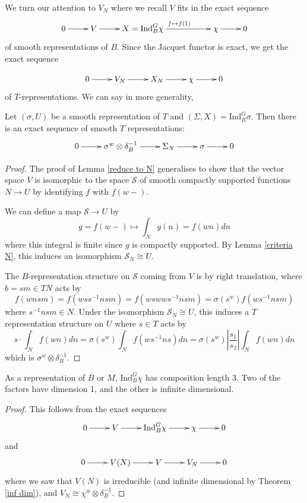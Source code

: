 We turn our attention to $V_N$ where we recall $V$ fits in the exact sequence
$$\xymatrix{0 \ar[r] & V \ar[r] & X = \mathrm{Ind}_B^G \chi \ar[rr]^{f \mapsto f(1)} && \chi \ar[r] & 0}$$ of smooth representations of $B$. Since the Jacquet functor is exact, we get the exact sequence

$$\xymatrix{0 \ar[r] & V_N \ar[r] & X_N \ar[r] & \chi \ar[r] & 0}$$ of $T$-representations. We can say in more generality,

\begin{lemma}
    Let $(\sigma, U)$ be a smooth representation of $T$ and $(\Sigma, X) = \mathrm{Ind}_B^G \sigma$. Then there is an exact sequence of smooth $T$ representations:
    $$\xymatrix{0 \ar[r] & \sigma^w \otimes \delta_B^{-1} \ar[r] & \Sigma_N \ar[r] & \sigma \ar[r] & 0}$$
\end{lemma}
\begin{proof}
    The proof of Lemma \ref{reduce to N} generalises to show that the vector space $V$ is isomorphic to the space $\mathcal S$ of smooth compactly supported functions $N \to U$ by identifying $f$ with $f(w-)$.

    We can define a map $\mathcal S \to U$ by 
    $$g=f(w-) \mapsto \int_N g(n)=f(wn) dn$$ where this integral is finite since $g$ is compactly supported. By Lemma \ref{criteria N}, this induces an isomorphism $\mathcal S_N \cong U$.

    The $B$-representation structure on $\mathcal S$ coming from $V$ is by right translation, where $b=sm \in TN$ acts by
    $$f(wnsm) = f(wss^{-1}nsm) = f(wswws^{-1}nsm) = \sigma(s^w) f(ws^{-1}nsm)$$
    where $s^{-1}nsm \in N$. Under the isomorphism $\mathcal S_N \cong U$, this induces a $T$ representation structure on $U$ where $s \in T$ acts by 
    $$s \cdot \int_N f(wn) dn = \sigma(s^w) \int_N f(w s^{-1}ns) dn = \sigma(s^w) |\frac{s_1}{s_2}| \int_N f(wn) dn$$ which is $\sigma^w \otimes \delta_B^{-1}$.
\end{proof}

\begin{cor}
    As a representation of $B$ or $M$, $\mathrm{Ind}_B^G \chi$ has composition length 3. Two of the factors have dimension 1, and the other is infinite dimensional.
\end{cor}
\begin{proof}
    This follows from the exact sequences
    $$\xymatrix{0 \ar[r] & V \ar[r] & \mathrm{Ind}_B^G \chi \ar[r] & \chi \ar[r] & 0}$$
    and
    $$\xymatrix{0 \ar[r] & V(N) \ar[r] & V \ar[r] & V_N \ar[r] & 0}$$
    where we saw that $V(N)$ is irreducible (and infinite dimensional by Theorem \ref{inf dim}), and $V_N \cong \chi^w \otimes \delta_B^{-1}$.
\end{proof}

